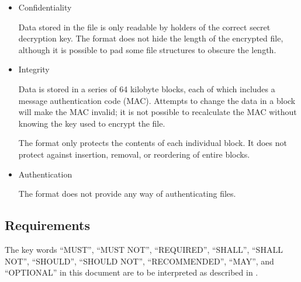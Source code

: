 \documentclass[10pt]{article}
\begin{document}
\begin{itemize}
\item Confidentiality

Data stored in the file is only readable by holders of the correct secret decryption key.
The format does not hide the length of the encrypted file, although it is possible to pad some file structures to
obscure the length.

\item Integrity

Data is stored in a series of 64 kilobyte blocks, each of which includes a message authentication code (MAC).
Attempts to change the data in a block will make the MAC invalid; it is not possible to recalculate the MAC without
knowing the key used to encrypt the file.

The format only protects the contents of each individual block.
It does not protect against insertion, removal, or reordering of entire blocks.

\item Authentication

The format does not provide any way of authenticating files.
\end{itemize}

\subsection{Requirements}
The key words ``MUST'', ``MUST NOT'', ``REQUIRED'', ``SHALL'', ``SHALL NOT'', ``SHOULD'', ``SHOULD NOT'',
``RECOMMENDED'', ``MAY'', and ``OPTIONAL'' in this document are to be interpreted as described in \cite{RFC2119}.
\end{document}
